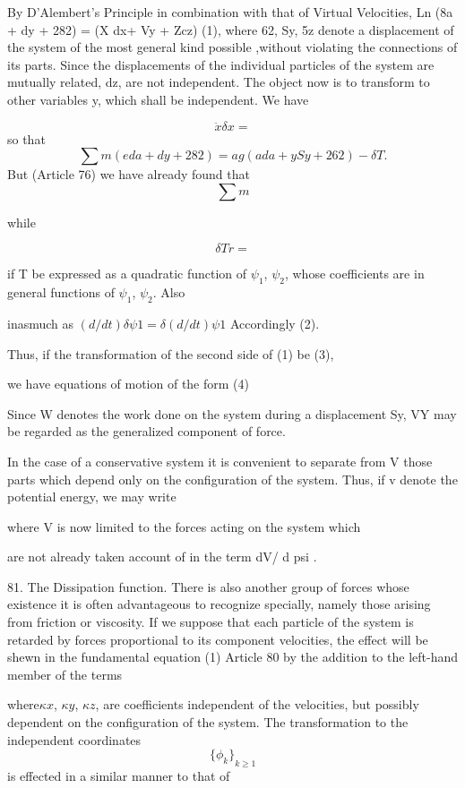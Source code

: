 By D'Alembert's Principle in combination with that of Virtual Velocities, Ln
(8a + dy + 282) = (X dx+ Vy + Zcz) (1), where 62, Sy, 5z denote a displacement
of the system of the most general kind possible ,without violating the
connections of its parts. Since the displacements of the individual particles
of the system are mutually related, dz, are not independent. The object now is
to transform to other variables y, which shall be independent. We have

\[ \ddot{x} \delta x = \]
so that
\[ \sum m (eda + dy + 282) = ag (ada + ySy + 262) - \delta T.  \]
 But (Article 76) we have already found that
\[\sum m\]

while

\[\delta T r=\]

if T be expressed as a quadratic function of \(\psi_1\), \(\psi_2\), whose
coefficients are in general functions of \(\psi_1\), \(\psi_2\).  Also

inasmuch as \((d/dt) \delta \psi 1 = \delta (d/dt) \psi 1\) Accordingly (2).

Thus, if the transformation of the second side of (1) be (3),

we have equations of motion of the form (4)

Since W denotes the work done on the system during a displacement Sy, VY may be
regarded as the generalized component of force.

In the case of a conservative system it is convenient to separate from V those
parts which depend only on the configuration of the system. Thus, if v denote
the potential energy, we may write

where V is now limited to the forces acting on the system which

are not already taken account of in the term dV/ d psi .

81.  The Dissipation function.
There is also another group of forces whose existence it is often
advantageous to recognize specially, namely those arising from friction or
viscosity. If we suppose that each particle of the system is retarded by forces
proportional to its component velocities, the effect will be shewn in the
fundamental equation (1) Article 80 by the addition to the left-hand member of
the terms

where\(\kappa x\), \(\kappa y\), \(\kappa z\), are coefficients independent of the
velocities, but possibly dependent on the configuration of the system. The
transformation to the independent coordinates
\[
{\{\phi_k\}}_{k\geq 1}
\]
is effected in a similar manner to that of

